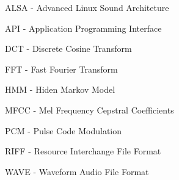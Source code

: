\begin{acronym}

\item ALSA - Advanced Linux Sound Architeture
\item API - Application Programming Interface



\item DCT - Discrete Cosine Transform

\item FFT - Fast Fourier Transform

\item HMM - Hiden Markov Model




\item MFCC - Mel Frequency Cepstral Coefficients



\item PCM - Pulse Code Modulation

\item RIFF - Resource Interchange File Format



\item WAVE - Waveform Audio File Format




\end{acronym}